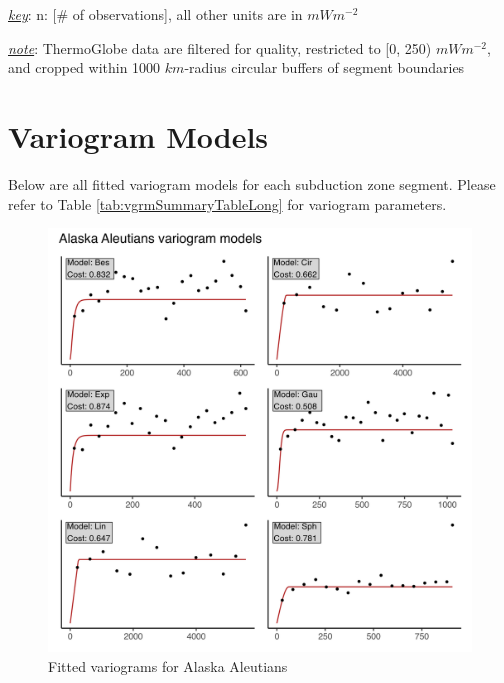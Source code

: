 \begin{table}
\begin{threeparttable}
\begin{tabular}[t]{lrrrrrrr}
\bottomrule
\end{tabular}
\begin{tablenotes}
\item \uline{\textit{key}}: n: [\# of observations], all other units are in $mWm^{-2}$
\item \uline{\textit{note}}: ThermoGlobe data are filtered for quality, restricted to [0, 250) $mWm^{-2}$, and cropped within 1000 $km$-radius circular buffers of segment boundaries
\end{tablenotes}
\end{threeparttable}
\end{table}

\clearpage

\hypertarget{vgrmModelsAppendix}{%
\section{Variogram Models}\label{vgrmModelsAppendix}}

Below are all fitted variogram models for each subduction zone segment. Please refer to Table \ref{tab:vgrmSummaryTableLong} for variogram parameters.

\begin{figure}
\centering
\includegraphics{assets/figs/chpt3/AlaskaAleutiansVgrms.png}
\caption[Fitted variograms for Alaska Aleutians]{Fitted variograms for Alaska Aleutians}
\end{figure}

